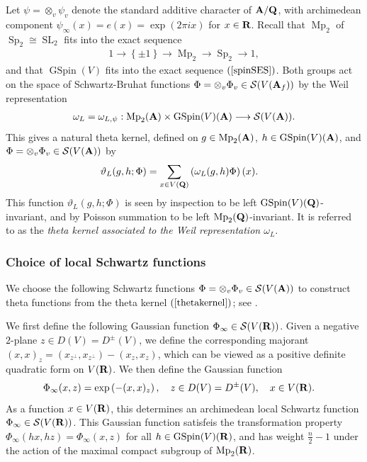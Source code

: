 \documentclass{amsart}
\theoremstyle{definition}
\theoremstyle{definition}
\theoremstyle{definition}
\begin{document}
Let $\psi = \otimes_v \psi_v$ denote the standard additive character of ${\bf{A}}/{\bf{Q}}$, with archimedean component $\psi_{\infty}(x) = e(x) = \exp(2 \pi i x)$ for $x \in {\bf{R}}$.
Recall that $\operatorname{Mp}_2$ of $\operatorname{Sp}_2 \cong \operatorname{SL}_2$ fits into the exact sequence 
\begin{align*} 1 \longrightarrow \left\lbrace \pm 1 \right\rbrace \longrightarrow \operatorname{Mp}_2 
\longrightarrow \operatorname{Sp}_2 \longrightarrow 1, \end{align*}
and that $\operatorname{GSpin}(V)$ fits into the exact sequence $(\ref{spinSES})$.
Both groups act on the space of Schwartz-Bruhat functions $\Phi = \otimes_v \Phi_v \in \mathcal{S}(V({\bf{A}}_f))$ by the Weil representation 
\begin{align*} \omega_L = \omega_{L, \psi}:  \operatorname{Mp}_2({\bf{A}}) \times \operatorname{GSpin}(V)({\bf{A}}) 
\longrightarrow \mathcal{S}(V({\bf{A}})). \end{align*}
This gives a natural theta kernel, defined on $g \in \operatorname{Mp}_2({\bf{A}})$, 
$h \in \operatorname{GSpin}(V)({\bf{A}})$, and $\Phi = \otimes_v \Phi_v \in \mathcal{S}(V({\bf{A}}))$ by  
\begin{align}\label{thetakernel} \vartheta_L(g, h; \Phi) &= \sum\limits_{x \in V({\bf{Q}})} \left( \omega_L(g, h) \Phi \right) (x). \end{align}
This function $\vartheta_L(g, h; \Phi)$ is seen by inspection to be left $\operatorname{GSpin}(V)({\bf{Q}})$-invariant, 
and by Poisson summation to be left $\operatorname{Mp}_2({\bf{Q}})$-invariant. 
It is referred to as the {\it{theta kernel associated to the Weil representation $\omega_L$}}.

\subsubsection{Choice of local Schwartz functions}

We choose the following Schwartz functions $\Phi = \otimes_v \Phi_v \in \mathcal{S}(V({\bf{A}}))$ to construct  
theta functions from the theta kernel $(\ref{thetakernel})$; see \cite{Bo, Br, BY}.

We first define the following Gaussian function $\Phi_{\infty} \in \mathcal{S}(V({\bf{R}}))$.
Given a negative $2$-plane $z \in D(V) = D^{\pm}(V)$, we define the corresponding majorant 
$(x, x)_z = (x_{z^{\perp}}, x_{z^{\perp}}) - (x_z, x_z)$, which can be viewed as a positive 
definite quadratic form on $V({\bf{R}})$. We then define the Gaussian function 
\begin{align}\label{Gaussian} \Phi_{\infty}(x, z) &= \exp \left( - (x, x)_z \right), \quad z \in D(V) = D^{\pm}(V), ~~~ x \in V({\bf{R}}). \end{align}
As a function $x \in V({\bf{R}})$, this determines an archimedean local Schwartz function $\Phi_{\infty} \in \mathcal{S}(V({\bf{R}}))$.
This Gaussian function satisfeis the transformation property $\Phi_{\infty}(hx, hz) = \Phi_{\infty}(x, z)$ for all $h \in \operatorname{GSpin}(V)({\bf{R}})$,
and has weight $\frac{n}{2}-1$ under the action of the maximal compact subgroup of $\operatorname{Mp}_2({\bf{R}})$.
\end{document}
